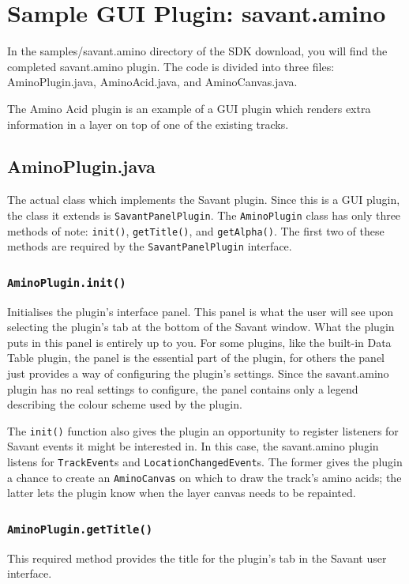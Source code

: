 \documentclass[times,11pt]{report}
\begin{document}
\chapter{Sample GUI Plugin: savant.amino}
\label{SampleGUIPlugin}
In the samples/savant.amino directory of the SDK download, you will find the completed savant.amino plugin.  The code is divided into three files: AminoPlugin.java, AminoAcid.java, and AminoCanvas.java.

The Amino Acid plugin is an example of a GUI plugin which renders extra information in a layer on top of one of the existing tracks.

\section{AminoPlugin.java}
The actual class which implements the Savant plugin.  Since this is a GUI plugin, the class it extends is {\tt SavantPanelPlugin}.  The {\tt AminoPlugin} class has only three methods of note:  {\tt init()}, {\tt getTitle()}, and {\tt getAlpha()}. The first two of these methods are required by the {\tt SavantPanelPlugin} interface.

\subsection{\tt AminoPlugin.init()}
Initialises the plugin's interface panel.  This panel is what the user will see upon selecting the plugin's tab at the bottom of the Savant window.  What the plugin puts in this panel is entirely up to you.  For some plugins, like the built-in Data Table plugin, the panel is the essential part of the plugin, for others the panel just provides a way of configuring the plugin's settings.  Since the savant.amino plugin has no real settings to configure, the panel contains only a legend describing the colour scheme used by the plugin.

The {\tt init()} function also gives the plugin an opportunity to register listeners for Savant events it might be interested in.  In this case, the savant.amino plugin listens for {\tt TrackEvent}s and {\tt LocationChangedEvent}s.  The former gives the plugin a chance to create an {\tt AminoCanvas} on which to draw the track's amino acids; the latter lets the plugin know when the layer canvas needs to be repainted.

\subsection{\tt AminoPlugin.getTitle()}
This required method provides the title for the plugin's tab in the Savant user interface.
\end{document}
